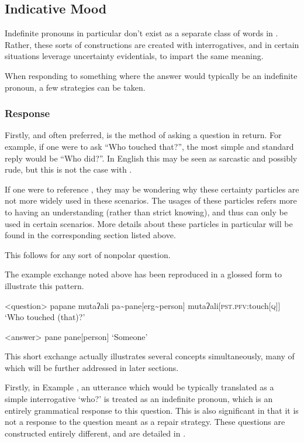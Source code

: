 \subsection{Indicative Mood}
Indefinite pronouns in particular don't exist as a separate class of words in \langname .
Rather, these sorts of constructions are created with interrogatives, and in certain situations leverage uncertainty evidentials, to impart the same meaning.

When responding to something where the answer would typically be an indefinite pronoun, a few strategies can be taken.
\subsubsection{Response}
Firstly, and often preferred, is the method of asking a question in return.
For example, if one were to ask ``Who touched that?'', the most simple and standard reply would be ``Who did?''.
In English this may be seen as sarcastic and possibly rude, but this is not the case with \langname .

If one were to reference , they may be wondering why these certainty particles are not more widely used in these scenarios.
The usages of these particles refers more to having an understanding (rather than strict knowing), and thus can only be used in certain scenarios.
More details about these particles in particular will be found in the corresponding section listed above.

This follows for any sort of nonpolar question.

The example exchange noted above has been reproduced in a glossed form to illustrate this pattern.

\a<question>
\begingl
\glpreamble papane mutaʔali
\endpreamble
pa\textasciitilde pane[erg\textasciitilde person]
mutaʔali[\textsc{pst.pfv:}touch\textsc{[q]}]
\glft `Who touched (that)?'
\endgl

\a<answer>
\begingl
\glpreamble pane
\endpreamble
pane[person]
\glft `Someone'
\endgl
\xe

This short exchange actually illustrates several concepts simultaneously, many of which will be further addressed in later sections.

Firstly, in Example , an utterance which would be typically translated as a simple interrogative `who?' is treated as an indefinite pronoun, which is an entirely grammatical response to this question.
This is also significant in that it is not a response to the question meant as a repair strategy.
These questions are constructed entirely different, and are detailed in .

